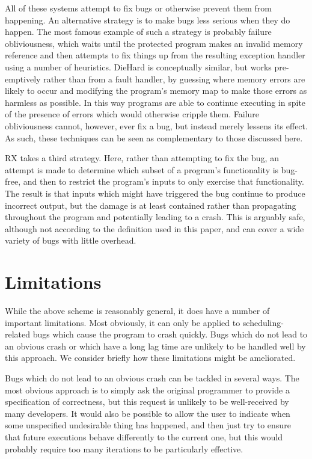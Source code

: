 \documentclass[10pt,a4paper,twocolumn]{article}
\begin{document}
All of these systems attempt to fix bugs or otherwise prevent them
from happening.  An alternative strategy is to make bugs less serious
when they do happen.  The most famous example of such a strategy is
probably failure obliviousness\cite{Rinard2004}, which waits until the
protected program makes an invalid memory reference and then attempts
to fix things up from the resulting exception handler using a number
of heuristics.  DieHard\cite{Berger2006} is conceptually similar, but
works pre-emptively rather than from a fault handler, by guessing
where memory errors are likely to occur and modifying the program's
memory map to make those errors as harmless as possible.  In this way
programs are able to continue executing in spite of the presence of
errors which would otherwise cripple them.  Failure obliviousness
cannot, however, ever fix a bug, but instead merely lessens its
effect.  As such, these techniques can
be seen as complementary to those discussed here.

RX\cite{Qin2007} takes a third strategy.  Here, rather than
attempting to fix the bug, an attempt is made to determine which
subset of a program's functionality is bug-free, and then to restrict
the program's inputs to only exercise that functionality.  The result
is that inputs which might have triggered the bug continue to produce
incorrect output, but the damage is at least contained rather than
propagating throughout the program and potentially leading to a crash.
This is arguably safe, although not according to the definition used
in this paper, and can cover a wide variety of bugs with little
overhead.

\section{Limitations}

While the above scheme is reasonably general, it does have a number of
important limitations.  Most obviously, it can only be applied to
scheduling-related bugs which cause the program to crash quickly.
Bugs which do not lead to an obvious crash or which have a long lag
time are unlikely to be handled well by this approach.  We consider
briefly how these limitations might be ameliorated.

Bugs which do not lead to an obvious crash can be tackled in several
ways.  The most obvious approach is to simply ask the original
programmer to provide a specification of correctness, but this request
is unlikely to be well-received by many developers.  It would also be
possible to allow the user to indicate when some unspecified
undesirable thing has happened, and then just try to ensure that
future executions behave differently to the current one, but this
would probably require too many iterations to be particularly
effective.
\end{document}
